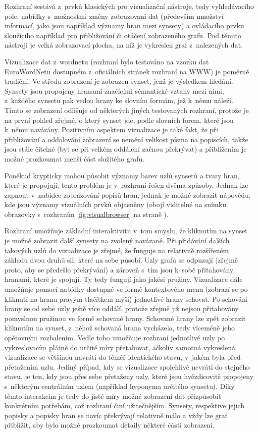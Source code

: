 \documentclass[a4paper, 11pt, oneside, showtrims]{book}
\begin{document}
					Rozhraní sestává z~prvků klasických pro vizualizační nástroje, tedy vyhledávacího pole, nabídky s~možnostmi změny zobrazovaní dat (především množství informací, jako jsou například významy hran mezi synsety) a ovládacího prvku sloužícího například pro přibližování či otáčení zobrazeného grafu. Pod těmito nástroji je velká zobrazovací plocha, na níž je vykreslen graf z~nalezených dat. 

					Vizualizace dat z~wordnetu (rozhraní bylo testováno na vzorku dat EuroWordNetu dostupném z~oficiálních stránek rozhraní na WWW) je poměrně tradiční. Ve středu zobrazení je zobrazen synset, jenž je výsledkem hledání. Synsety jsou propojeny hranami značícími sémantické vztahy mezi nimi, z~každého synsetu pak vedou hrany ke slovním formám, jež k~němu náleží. Tímto se zobrazení odlišuje od některých jiných testovaných rozhraní, protože je na první pohled zřejmé, o který synset jde, podle slovních forem, které jsou k~němu navázány. Pozitivním aspektem vizualizace je také fakt, že při přibližování a oddalování zobrazení se nemění velikost písma na popiscích, takže jsou stále čitelné (byť se při velkém oddálení začnou překrývat) a přiblížením je možné prozkoumat menší část složitého grafu. 

					Poněkud krypticky mohou působit významy barev uzlů synsetů a tvary hran, které je propojují, tento problém je v~rozhraní řešen dvěma způsoby. Jednak lze zapnout v~nabídce zobrazování popisů hran, jednak je možné zobrazit nápovědu, kde jsou významy vizuálních prvků objasněny (obojí viditelné na snímku obrazovky s~rozhraním \ref{fig:visualbrowser} na straně \pageref{fig:visualbrowser}). 

					Rozhraní umožňuje základní interaktivitu v~tom smyslu, že kliknutím na synset je možné zobrazit další synsety na zvolený navázané. Při přidávání dalších takových uzlů do vizualizace je zřejmé, že funguje na relativně rozšířeném základu dvou druhů sil, které na sebe působí. Uzly grafu se odpuzují (zřejmě proto, aby se předešlo překrývání) a zároveň s~tím jsou k~sobě přitahovány hranami, které je spojují. Ty tedy fungují jako jakési pružiny. Vizualizace dále umožňuje pomocí nabídky dostupné ve formě kontextového menu (zobrazí se po kliknutí na hranu pravým tlačítkem myši) jednotlivé hrany schovat. Po schování hrany se od sebe uzly ještě více oddálí, protože zřejmě již nejsou přitahovány pomyslnou pružinou ve formě schované hrany. Schované hrany lze zpět zobrazit kliknutím na synset, z~něhož schovaná hrana vycházela, tedy víceméně jeho opětovným rozbalením. Vedle toho umožňuje rozhraní jednotlivé uzly po vykreslovacím plátně do určité míry přetahovat, ačkoliv samotná vykreslená vizualizace se většinou navrátí do téměř identického stavu, v~jakém byla před přetažením uzlu. Jediný případ, kdy se vizualizace spolehlivě nevrátí do stejného stavu, je ten, kdy jsou přes sebe přetaženy uzly, které jsou hvězdicovitě propojeny s~některým centrálním uzlem (například hyponyma určitého synsetu). Díky těmto interakcím je tedy do jisté míry možné zobrazení dat přizpůsobit konkrétním potřebám, což rozhraní činí užitečnějším. Synsety, respektive jejich popisky a popisky hran se navíc překrývají relativně málo a vždy lze graf přiblížit, aby bylo možné prozkoumat detaily některé části zobrazení.
\end{document}
